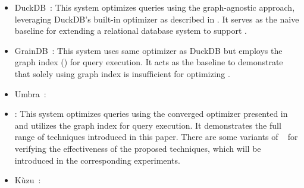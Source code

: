 \begin{itemize}
\item DuckDB~\cite{duckdb}: This system optimizes queries using the graph-agnostic approach, leveraging DuckDB's built-in optimizer as described in . It serves as the naive baseline for extending a relational database system to support \spjm.

\item GrainDB~\cite{graindb}: This system uses same optimizer as DuckDB but employs the graph index () for query execution. It acts as the baseline to demonstrate that solely using graph index is insufficient for optimizing \spjm.


\item Umbra~\cite{umbra2020vldb,umbra2020cidr}: 

\item \name: This system optimizes queries using the converged optimizer presented in  and utilizes the graph index for query execution. It demonstrates the full range of techniques introduced in this paper. There are some variants
of \name~ for verifying the effectiveness of the proposed techniques, which will be introduced in the corresponding experiments.

\item K\`uzu~\cite{jin2023cidr}:
\end{itemize}

